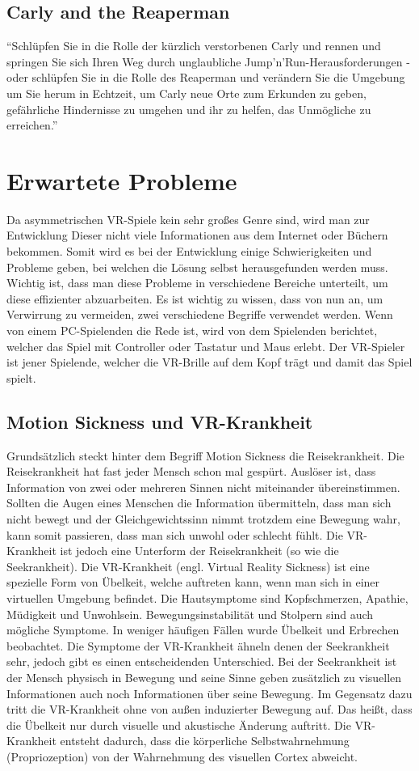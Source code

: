 \subsection{Carly and the Reaperman}
"`Schlüpfen Sie in die Rolle der kürzlich verstorbenen Carly und rennen und springen Sie sich Ihren Weg durch unglaubliche Jump'n'Run-Herausforderungen - oder schlüpfen Sie in die Rolle des Reaperman und verändern Sie die Umgebung um Sie herum in Echtzeit, um Carly neue Orte zum Erkunden zu geben, gefährliche Hindernisse zu umgehen und ihr zu helfen, das Unmögliche zu erreichen."'
\cite{_steam_carly}

\section{Erwartete Probleme}
Da asymmetrischen VR-Spiele kein sehr großes Genre sind, wird man zur Entwicklung Dieser nicht viele Informationen aus dem Internet oder Büchern bekommen. Somit wird es bei der Entwicklung einige Schwierigkeiten und Probleme geben, bei welchen die Lösung selbst herausgefunden werden muss. Wichtig ist, dass man diese Probleme in verschiedene Bereiche unterteilt, um diese effizienter abzuarbeiten. Es ist wichtig zu wissen, dass von nun an, um Verwirrung zu vermeiden, zwei verschiedene Begriffe verwendet werden. Wenn von einem PC-Spielenden die Rede ist, wird von dem Spielenden berichtet, welcher das Spiel mit Controller oder Tastatur und Maus erlebt. Der VR-Spieler ist jener Spielende, welcher die VR-Brille auf dem Kopf trägt und damit das Spiel spielt. 

\subsection{Motion Sickness und VR-Krankheit} \label{simon_motionsickness}
Grundsätzlich steckt hinter dem Begriff Motion Sickness die Reisekrankheit. Die Reisekrankheit hat fast jeder Mensch schon mal gespürt. Auslöser ist, dass Information von zwei oder mehreren Sinnen nicht miteinander übereinstimmen. Sollten die Augen eines Menschen die Information übermitteln, dass man sich nicht bewegt und der Gleichgewichtssinn nimmt trotzdem eine Bewegung wahr, kann somit passieren, dass man sich unwohl oder schlecht fühlt. Die VR-Krankheit ist jedoch eine Unterform der Reisekrankheit (so wie die Seekrankheit).
Die VR-Krankheit (engl. Virtual Reality Sickness) ist eine spezielle Form von Übelkeit, welche auftreten kann, wenn man sich in einer virtuellen Umgebung befindet. Die Hautsymptome sind Kopfschmerzen, Apathie, Müdigkeit und Unwohlsein. Bewegungsinstabilität und Stolpern sind auch mögliche Symptome. In weniger häufigen Fällen wurde Übelkeit und Erbrechen beobachtet. Die Symptome der VR-Krankheit ähneln denen der Seekrankheit sehr, jedoch gibt es einen entscheidenden Unterschied. Bei der Seekrankheit ist der Mensch physisch in Bewegung und seine Sinne geben zusätzlich zu visuellen Informationen auch noch Informationen über seine Bewegung. Im Gegensatz dazu tritt die VR-Krankheit ohne von außen induzierter Bewegung auf. Das heißt, dass die Übelkeit nur durch visuelle und akustische Änderung auftritt. Die VR-Krankheit entsteht dadurch, dass die körperliche Selbstwahrnehmung (Propriozeption) von der Wahrnehmung des visuellen Cortex abweicht.

